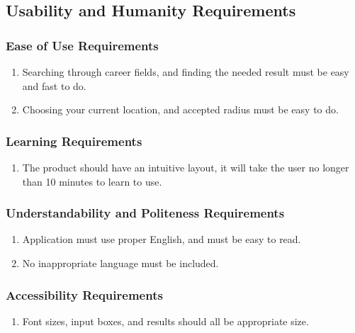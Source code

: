 \documentclass[english]{article}
\begin{document}

\subsection{Usability and Humanity Requirements}
\label{sub:usability_and_humanity_requirements}

\subsubsection{Ease of Use Requirements}
\label{ssub:ease_of_use_requirements}
\begin{enumerate}[{EUR}1. ]

\item Searching through career fields, and finding the needed result must be easy and fast to do.

\item Choosing your current location, and accepted radius must be easy to do.

\end{enumerate}


\subsubsection{Learning Requirements}
\label{ssub:learning_requirements}
\begin{enumerate}[{LR}1. ]
\item The product should have an intuitive layout, it will take the user no longer than 10 minutes to learn to use.
\end{enumerate}

\subsubsection{Understandability and Politeness Requirements}
\label{ssub:understandability_and_politeness_requirements}
\begin{enumerate}[{UPR}1. ]
\item Application must use proper English, and must be easy to read.

\item No inappropriate language must be included.
\end{enumerate}

\subsubsection{Accessibility Requirements}
\label{ssub:accessibility_requirements}
\begin{enumerate}[{ACR}1. ]
\item Font sizes, input boxes, and results should all be appropriate size.
\end{enumerate}
\end{document}
